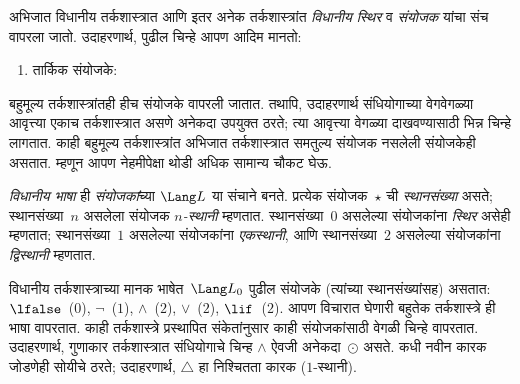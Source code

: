 \documentclass[../../../include/open-logic-section]{subfiles}
\begin{document}


अभिजात विधानीय तर्कशास्त्रात आणि इतर अनेक तर्कशास्त्रांत
\emph{विधानीय स्थिर} व \emph{संयोजक} यांचा संच वापरला जातो.
उदाहरणार्थ, पुढील चिन्हे आपण आदिम मानतो:
\begin{enumerate}
\item तार्किक संयोजके:
  \startycommalist
\end{enumerate}

बहुमूल्य तर्कशास्त्रांतही हीच संयोजके वापरली जातात. तथापि,
उदाहरणार्थ संधियोगाच्या वेगवेगळ्या आवृत्त्या एकाच तर्कशास्त्रात
असणे अनेकदा उपयुक्त ठरते; त्या आवृत्त्या वेगळ्या दाखवण्यासाठी
भिन्न चिन्हे लागतात. काही बहुमूल्य तर्कशास्त्रांत अभिजात
तर्कशास्त्रात समतुल्य संयोजक नसलेली संयोजकेही असतात.
म्हणून आपण नेहमीपेक्षा थोडी अधिक सामान्य चौकट घेऊ.

\begin{defn}
  \emph{विधानीय भाषा} ही \emph{संयोजकां}च्या $\Lang L$
  या संचाने बनते. प्रत्येक संयोजक~$\star$ ची \emph{स्थानसंख्या}
  असते; स्थानसंख्या~$n$ असलेला संयोजक \emph{$n$-स्थानी}
  म्हणतात. स्थानसंख्या~$0$ असलेल्या संयोजकांना
  \emph{स्थिर} असेही म्हणतात; स्थानसंख्या~$1$ असलेल्या
  संयोजकांना \emph{एकस्थानी}, आणि स्थानसंख्या~$2$ असलेल्या
  संयोजकांना \emph{द्विस्थानी} म्हणतात.
\end{defn}

\begin{ex}
  विधानीय तर्कशास्त्राच्या मानक भाषेत~$\Lang L_0$ पुढील
  संयोजके (त्यांच्या स्थानसंख्यांसह) असतात:
  $\lfalse$~($0$),
  $\lnot$~($1$),
  $\land$~($2$),
  $\lor$~($2$),
  $\lif$~($2$). आपण विचारात घेणारी बहुतेक तर्कशास्त्रे
  ही भाषा वापरतात. काही तर्कशास्त्रे प्रस्थापित संकेतांनुसार
  काही संयोजकांसाठी वेगळी चिन्हे वापरतात. उदाहरणार्थ,
  गुणाकार तर्कशास्त्रात संधियोगाचे चिन्ह $\land$ ऐवजी
  अनेकदा~$\odot$ असते. कधी नवीन कारक जोडणेही सोयीचे
  ठरते; उदाहरणार्थ, $\triangle$ हा निश्चितता कारक
  ($1$-स्थानी).
\end{ex}
\end{document}

